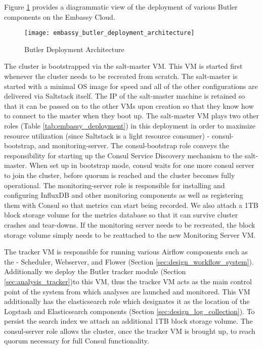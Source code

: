 Figure \ref{fig:embassy_butler_deployment_architecture} provides a diagrammatic view of the deployment of various Butler components on the Embassy Cloud.

\begin{figure}[H]
\texttt{[image: embassy\_butler\_deployment\_architecture]}
\centering
\caption {Butler Deployment Architecture}
\label{fig:embassy_butler_deployment_architecture}
\end{figure}

The cluster is bootstrapped via the salt-master VM. This VM is started first whenever the cluster needs to be recreated from scratch. The salt-master is started with a minimal OS image for speed and all of the other configurations are delivered via Saltstack itself. The IP of the salt-master machine is retained so that it can be passed on to the other VMs upon creation so that they know how to connect to the master when they boot up. The salt-master VM plays two other roles (Table \ref{tab:embassy_deployment}) in this deployment in order to maximize resource utilization (since Saltstack is a light resource consumer) - consul-bootstrap, and monitoring-server. The consul-bootstrap role conveys the responsibility for starting up the Consul Service Discovery mechanism to the salt-master. When set up in bootstrap mode, consul waits for one more consul server to join the cluster, before quorum is reached and the cluster becomes fully operational. The monitoring-server role is responsible for installing and configuring InfluxDB and other monitoring components  as well as registering them with Consul so that metrics can start being recorded. We also attach a 1TB block storage volume for the metrics database so that it can survive cluster crashes and tear-downs. If the monitoring server needs to be recreated, the block storage volume simply needs to be reattached to the new Monitoring Server VM.

The tracker VM is responsible for running various Airflow components such as the - Scheduler, Webserver, and Flower (Section \ref{sec:design_workflow_system}). Additionally we deploy the Butler tracker module (Section \ref{sec:analysis_tracker})to this VM, thus the tracker VM acts as the main control point of the system from which analyses are launched and monitored. This VM additionally has the elasticsearch role which designates it as the location of the Logstash and Elasticsearch components (Section \ref{sec:design_log_collection}). To persist the search index we attach an additional 1TB block storage volume. The consul-server role allows the cluster, once the tracker VM is brought up, to reach quorum necessary for full Consul functionality. 


